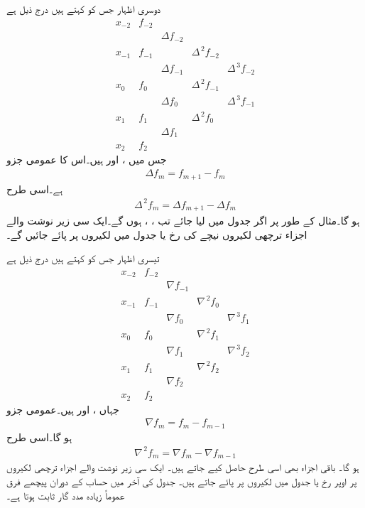 دوسری اظہار جس کو  کہتے ہیں درج ذیل ہے
\begin{equation*}
\begin{array}{lllll}
x_{-2}&f_{-2}&&&\\
&&\Delta f_{-2}&&\\
x_{-1}&f_{-1}&&\Delta^{\,2} f_{-2}&\\
&&\Delta f_{-1}&&\Delta^{\,3} f_{-2}\\
x_0&f_0&&\Delta^{\,2} f_{-1}&\\
&&\Delta f_{0}&&\Delta^{\,3} f_{-1}\\
x_1&f_1&&\Delta^{\,2} f_{0}&\\
&&\Delta f_{1}&&\\
x_2&f_2&&&
\end{array}
\end{equation*}
جس میں ،   اور  ہیں۔اس کا عمومی جزو
\begin{align}
\Delta f_m=f_{m+1}-f_m
\end{align}
ہے۔اسی طرح
\begin{align*}
\Delta^{\,2}f_m=\Delta f_{m+1}-\Delta f_m
\end{align*}
ہو گا۔مثال کے طور پر اگر جدول  میں  لیا جائے تب ، ،
  ہوں گے۔ایک سی زیر نوشت والے اجزاء ترچھی لکیروں نیچے کی رخ یا جدول میں  لکیروں پر پائے جائیں گے۔ 

تیسری اظہار جس کو  کہتے ہیں درج ذیل ہے
\begin{equation*}
\begin{array}{lllll}
x_{-2}&f_{-2}&&&\\
&&\nabla f_{-1}&&\\
x_{-1}&f_{-1}&&\nabla^{\,2} f_{0}&\\
&&\nabla f_{0}&&\nabla^{\,3} f_{1}\\
x_0&f_0&&\nabla^{\,2} f_{1}&\\
&&\nabla f_{1}&&\nabla^{\,3} f_{2}\\
x_1&f_1&&\nabla^{\,2} f_{2}&\\
&&\nabla f_{2}&&\\
x_2&f_2&&&
\end{array}
\end{equation*}
جہاں ،  اور  ہیں۔عمومی جزو
\begin{align}
\nabla f_m=f_m-f_{m-1}
\end{align}
ہو گا۔اسی طرح 
\begin{align*}
\nabla^{\,2}f_m=\nabla f_m-\nabla f_{m-1}
\end{align*}
ہو گا۔ باقی اجزاء بھی اسی طرح حاصل کیے جاتے ہیں۔
ایک سی  زیر نوشت والے اجزاء ترچھی لکیروں پر اوپر رخ یا جدول میں  لکیروں پر پائے جاتے ہیں۔ جدول کی آخر میں حساب کے دوران پیچھے فرق عموماً زیادہ مدد گار ثابت ہوتا ہے۔ 

